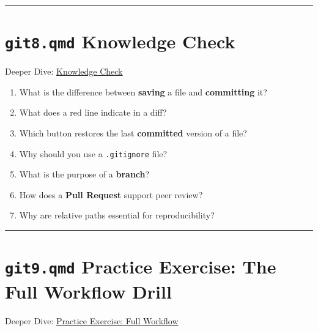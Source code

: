 \documentclass[
  letterpaper,
  DIV=11,
  numbers=noendperiod,
  oneside]{scrreprt}
\providecommand{\tightlist}{%
  \setlength{\itemsep}{0pt}\setlength{\parskip}{0pt}}
\begin{document}
\begin{center}\rule{0.5\linewidth}{0.5pt}\end{center}

\section*{\texorpdfstring{\texttt{git8.qmd} Knowledge
Check}{git8.qmd Knowledge Check}}\label{git8.qmd-knowledge-check}


Deeper Dive: \href{git08-knowledge-check.qmd}{Knowledge Check}

\begin{enumerate}
\def\labelenumi{\arabic{enumi}.}
\tightlist
\item
  What is the difference between \textbf{saving} a file and
  \textbf{committing} it?
\item
  What does a red line indicate in a diff?
\item
  Which button restores the last \textbf{committed} version of a file?
\item
  Why should you use a \texttt{.gitignore} file?
\item
  What is the purpose of a \textbf{branch}?
\item
  How does a \textbf{Pull Request} support peer review?
\item
  Why are relative paths essential for reproducibility?
\end{enumerate}

\begin{center}\rule{0.5\linewidth}{0.5pt}\end{center}

\section*{\texorpdfstring{\texttt{git9.qmd} Practice Exercise: The Full
Workflow
Drill}{git9.qmd Practice Exercise: The Full Workflow Drill}}\label{git9.qmd-practice-exercise-the-full-workflow-drill}


Deeper Dive: \href{git09-practice-exercise.qmd}{Practice Exercise: Full
Workflow}
\end{document}
